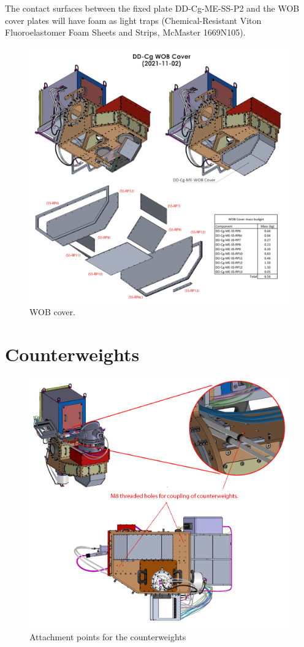 \documentclass{report}
\begin{document}
The contact surfaces between the fixed plate DD-Cg-ME-SS-P2 and the WOB cover plates will have foam as light traps (Chemical-Resistant Viton Fluoroelastomer Foam Sheets and Strips, McMaster 1669N105).

\begin{figure}
\centering
\includegraphics[width=1\linewidth]{figures/SSwobcover.png}
\caption{WOB cover.}
\label{figure:SSwobcover}
\end{figure}

\section{Counterweights}


\begin{figure}
    \centering
    \includegraphics[width=0.7\linewidth]{figures/DD-Cg-CounterWeights.png}
    \caption{Attachment points for the counterweights}
    \label{figure:counterweights}
\end{figure}
\end{document}
